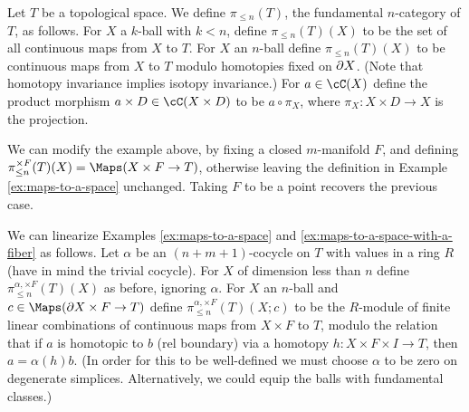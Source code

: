 \begin{example}
\rm
\label{ex:maps-to-a-space}%
Let $T$ be a topological space.
We define $\pi_{\leq n}(T)$, the fundamental $n$-category of $T$, as follows.
For $X$ a $k$-ball with $k < n$, define $\pi_{\leq n}(T)(X)$ to be the set of 
all continuous maps from $X$ to $T$.
For $X$ an $n$-ball define $\pi_{\leq n}(T)(X)$ to be continuous maps from $X$ to $T$ modulo
homotopies fixed on $\partial X$.
(Note that homotopy invariance implies isotopy invariance.)
For $a\in \cC(X)$ define the product morphism $a\times D \in \cC(X\times D)$ to
be $a\circ\pi_X$, where $\pi_X : X\times D \to X$ is the projection.
\end{example}


\begin{example} \label{ex:maps-with-fiber}
\rm
\label{ex:maps-to-a-space-with-a-fiber}%
We can modify the example above, by fixing a
closed $m$-manifold $F$, and defining $\pi^{\times F}_{\leq n}(T)(X) = \Maps(X \times F \to T)$, 
otherwise leaving the definition in Example \ref{ex:maps-to-a-space} unchanged.
Taking $F$ to be a point recovers the previous case.
\end{example}

\begin{example}
\rm
\label{ex:linearized-maps-to-a-space}%
We can linearize Examples \ref{ex:maps-to-a-space} and \ref{ex:maps-to-a-space-with-a-fiber} as follows.
Let $\alpha$ be an $(n{+}m{+}1)$-cocycle on $T$ with values in a ring $R$
(have in mind the trivial cocycle).
For $X$ of dimension less than $n$ define $\pi^{\alpha, \times F}_{\leq n}(T)(X)$ as before, ignoring $\alpha$.
For $X$ an $n$-ball and $c\in \Maps(\bdy X \times F \to T)$ define $\pi^{\alpha, \times F}_{\leq n}(T)(X; c)$ to be
the $R$-module of finite linear combinations of continuous maps from $X\times F$ to $T$,
modulo the relation that if $a$ is homotopic to $b$ (rel boundary) via a homotopy
$h: X\times F\times I \to T$, then $a = \alpha(h)b$.
(In order for this to be well-defined we must choose $\alpha$ to be zero on degenerate simplices.
Alternatively, we could equip the balls with fundamental classes.)
\end{example}

